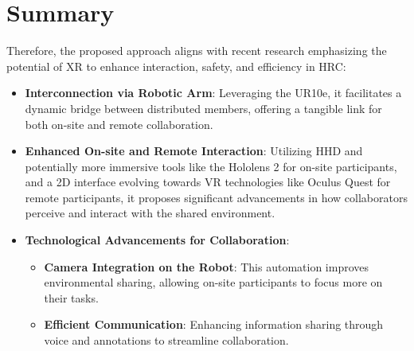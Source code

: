 

\section{Summary}
Therefore, the proposed approach aligns with recent research emphasizing the potential of \ac{XR} to enhance interaction, safety, and efficiency 
in \ac{HRC}:
\begin{itemize}
    \item \textbf{Interconnection via Robotic Arm}: Leveraging the UR10e, it facilitates a dynamic bridge between distributed members, offering a 
    tangible link for both on-site and remote collaboration.

    \item \textbf{Enhanced On-site and Remote Interaction}: Utilizing \ac{HHD} and potentially more immersive tools like the Hololens 2 for on-site 
    participants, and a 2D interface evolving towards \ac{VR} technologies like Oculus Quest for remote participants, it proposes significant advancements 
    in how collaborators perceive and interact with the shared environment.

    \item \textbf{Technological Advancements for Collaboration}:
    \begin{itemize}
        \item \textbf{Camera Integration on the Robot}: This automation improves environmental sharing, allowing on-site participants to focus more 
        on their tasks. 
        \item \textbf{Efficient Communication}: Enhancing information sharing through voice and annotations to streamline collaboration.
    \end{itemize}
\end{itemize}










